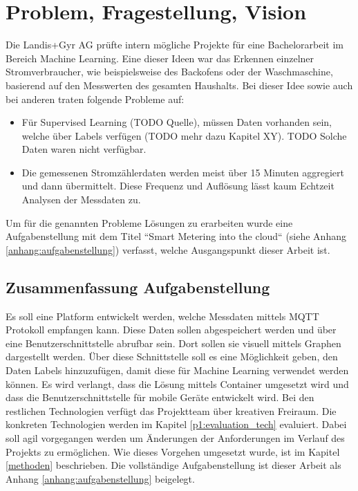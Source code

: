 \chapter{Problem, Fragestellung, Vision}

Die Landis+Gyr AG prüfte intern mögliche Projekte für eine Bachelorarbeit im Bereich Machine Learning.
Eine dieser Ideen war das Erkennen einzelner Stromverbraucher, wie beispielsweise des Backofens oder der Waschmaschine,
basierend auf den Messwerten des gesamten Haushalts.
Bei dieser Idee sowie auch bei anderen traten folgende Probleme auf:
\begin{itemize}
      \item Für Supervised Learning (TODO Quelle), müssen Daten vorhanden sein,
            welche über Labels verfügen (TODO mehr dazu Kapitel XY). TODO 
            Solche Daten waren nicht verfügbar.
      \item Die gemessenen Stromzählerdaten werden meist über 15 Minuten aggregiert und dann übermittelt.
            Diese Frequenz und Auflösung lässt kaum Echtzeit Analysen der Messdaten zu.

\end{itemize}

Um für die genannten Probleme Lösungen zu erarbeiten wurde eine Aufgabenstellung mit dem Titel ``Smart Metering into the cloud`` (siehe Anhang \ref{anhang:aufgabenstellung}) verfasst,
welche Ausgangspunkt dieser Arbeit ist.

\section{Zusammenfassung Aufgabenstellung}
\label{aufgabenstellung}

Es soll eine Platform entwickelt werden, welche Messdaten mittels \ac{MQTT} Protokoll  empfangen kann.
Diese Daten sollen abgespeichert werden und über eine Benutzerschnittstelle abrufbar sein.
Dort sollen sie visuell mittels Graphen dargestellt werden.
Über diese Schnittstelle soll es eine Möglichkeit geben, den Daten Labels hinzuzufügen,
damit diese für Machine Learning verwendet werden können.
Es wird verlangt, dass die Lösung mittels Container umgesetzt wird und dass die Benutzerschnittstelle für mobile Geräte entwickelt wird.
Bei den restlichen Technologien verfügt das Projektteam über kreativen Freiraum.
Die konkreten Technologien werden im Kapitel \ref{p1:evaluation_tech} evaluiert.
Dabei soll agil vorgegangen werden um Änderungen der Anforderungen im Verlauf des Projekts zu ermöglichen.
Wie dieses Vorgehen umgesetzt wurde, ist im Kapitel \ref{methoden} beschrieben.
Die vollständige Aufgabenstellung ist dieser Arbeit als Anhang \ref{anhang:aufgabenstellung} beigelegt.

